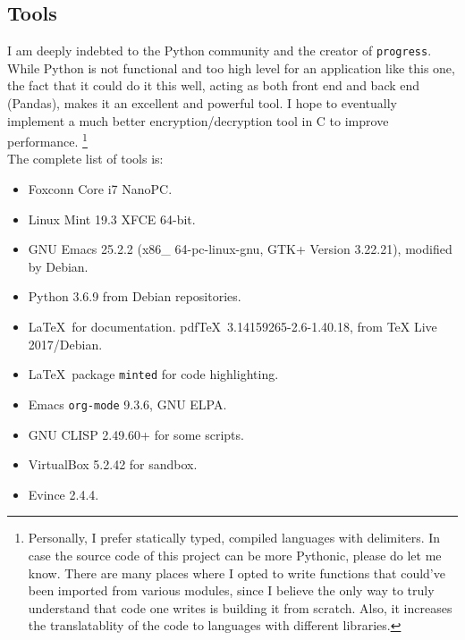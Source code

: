 \documentclass[twoside]{article}
\begin{document}
\subsection{Tools}
I am deeply indebted to the Python community and the creator of \texttt{progress}. While Python
is not functional and too high level for an application like this one, the fact that it could do it
this well, acting as both front end and back end (Pandas), makes it an excellent and powerful tool.
I hope to eventually implement a much better encryption/decryption tool in C to improve performance.
\footnote{Personally, I prefer statically typed, compiled languages with delimiters. In case the
source code of this project can be more Pythonic, please do let me know. There are many places where
I opted to write functions that could've been imported from various modules, since I believe the
only way to truly understand that code one writes is building it from scratch. Also, it increases
the translatablity of the code to languages with different libraries.} \\

The complete list of tools is:
\begin{multicols}{3}
\begin{itemize}
\item Foxconn Core i7 NanoPC.
\item Linux Mint 19.3 XFCE 64-bit.
\item GNU Emacs 25.2.2 (x86\_ 64-pc-linux-gnu, GTK+ Version 3.22.21),
  modified by Debian.
\item Python 3.6.9 from Debian repositories.
\item \LaTeX\ for documentation. pdf\TeX\ 3.14159265-2.6-1.40.18, from
  TeX Live 2017/Debian.
\item \LaTeX\ package \texttt{minted} for code highlighting.
\item Emacs \texttt{org-mode} 9.3.6, GNU ELPA.
\item GNU CLISP 2.49.60+ for some scripts.
\item VirtualBox 5.2.42 for sandbox.
\item Evince 2.4.4.
\end{itemize}
\end{multicols}
\end{document}
